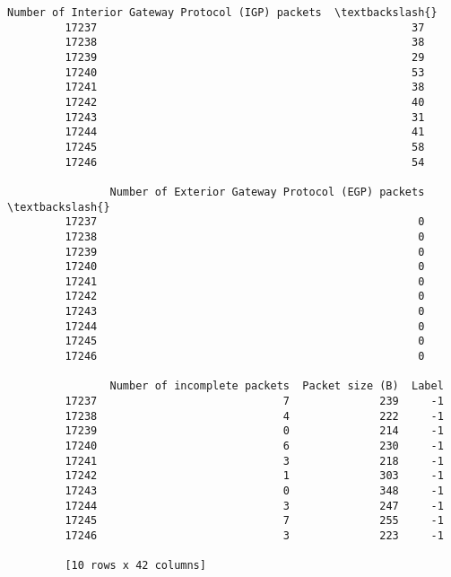 \documentclass[11pt]{article}
\begin{document}
\begin{Verbatim}[commandchars=\\\{\}]
                Number of Interior Gateway Protocol (IGP) packets  \textbackslash{}
         17237                                                 37   
         17238                                                 38   
         17239                                                 29   
         17240                                                 53   
         17241                                                 38   
         17242                                                 40   
         17243                                                 31   
         17244                                                 41   
         17245                                                 58   
         17246                                                 54   
         
                Number of Exterior Gateway Protocol (EGP) packets  \textbackslash{}
         17237                                                  0   
         17238                                                  0   
         17239                                                  0   
         17240                                                  0   
         17241                                                  0   
         17242                                                  0   
         17243                                                  0   
         17244                                                  0   
         17245                                                  0   
         17246                                                  0   
         
                Number of incomplete packets  Packet size (B)  Label  
         17237                             7              239     -1  
         17238                             4              222     -1  
         17239                             0              214     -1  
         17240                             6              230     -1  
         17241                             3              218     -1  
         17242                             1              303     -1  
         17243                             0              348     -1  
         17244                             3              247     -1  
         17245                             7              255     -1  
         17246                             3              223     -1  
         
         [10 rows x 42 columns]
\end{Verbatim}
            
\end{document}
